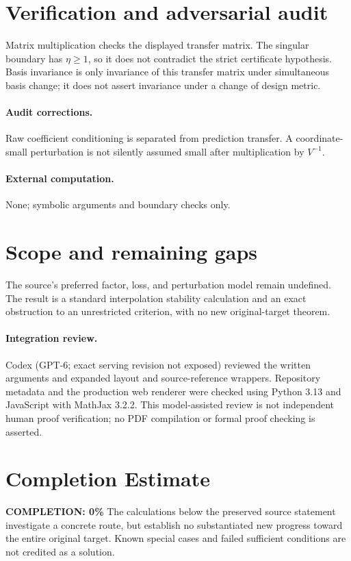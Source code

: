 \documentclass[11pt]{article}
\begin{document}
\section{Verification and adversarial audit}
Matrix multiplication checks the displayed transfer matrix. The singular boundary has $\eta\ge1$, so it does not contradict the strict certificate hypothesis. Basis invariance is only invariance of this transfer matrix under simultaneous basis change; it does not assert invariance under a change of design metric.
\paragraph{Audit corrections.} Raw coefficient conditioning is separated from prediction transfer. A coordinate-small perturbation is not silently assumed small after multiplication by $V^{-1}$.
\paragraph{External computation.} None; symbolic arguments and boundary checks only.
\section{Scope and remaining gaps}
The source's preferred factor, loss, and perturbation model remain undefined. The result is a standard interpolation stability calculation and an exact obstruction to an unrestricted criterion, with no new original-target theorem.
\paragraph{Integration review.} Codex (GPT-6; exact serving revision not exposed) reviewed the written arguments and expanded layout and source-reference wrappers. Repository metadata and the production web renderer were checked using Python 3.13 and JavaScript with MathJax 3.2.2. This model-assisted review is not independent human proof verification; no PDF compilation or formal proof checking is asserted.

\section{Completion Estimate}
\noindent\textbf{COMPLETION: 0\%}
The calculations below the preserved source statement investigate a concrete route,
but establish no substantiated new progress toward the entire original target.
Known special cases and failed sufficient conditions are not credited as a solution.
\end{document}
